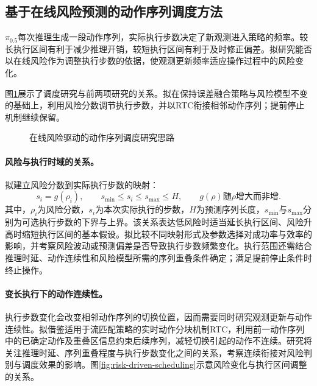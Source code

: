 \subsection{基于在线风险预测的动作序列调度方法}
\label{subsec:improvement-three}

\(\pi_{0.5}\)每次推理生成一段动作序列，实际执行步数决定了新观测进入策略的频率。较长执行区间有利于减少推理开销，较短执行区间有利于及时修正偏差。拟研究能否以在线风险作为调整执行步数的依据，使观测更新频率适应操作过程中的风险变化。

图\ref{fig:policy-risk-scheduling-delta}展示了调度研究与前两项研究的关系。拟在保持误差融合策略与风险模型不变的基础上，利用风险分数调节执行步数，并以RTC衔接相邻动作序列；提前停止机制继续保留。

\begin{figure}[htbp]
  \centering
  
  \caption{在线风险驱动的动作序列调度研究思路}
  \label{fig:policy-risk-scheduling-delta}
\end{figure}

\paragraph{风险与执行时域的关系。}
拟建立风险分数到实际执行步数的映射：
\begin{equation}
  s_i=g(\rho_i),\qquad
  s_{\min}\le s_i\le s_{\max}\le H,
  \qquad g(\rho)\text{随}\rho\text{增大而非增}.
  \label{eq:risk-schedule-rule}
\end{equation}
其中，\(\rho_i\)为风险分数，\(s_i\)为本次实际执行的步数，\(H\)为预测序列长度，\(s_{\min}\)与\(s_{\max}\)分别为可选执行步数的下界与上界。该关系表达低风险时适当延长执行区间、风险升高时缩短执行区间的基本假设。拟比较不同映射形式及参数选择对成功率与效率的影响，并考察风险波动或预测偏差是否导致执行步数频繁变化。执行范围还需结合推理时延、动作连续性和风险模型所需的序列重叠条件确定；满足提前停止条件时终止操作。

\paragraph{变长执行下的动作连续性。}
执行步数变化会改变相邻动作序列的切换位置，因而需要同时研究观测更新与动作连续性。拟借鉴适用于流匹配策略的实时动作分块机制RTC\cite{black2025rtc}，利用前一动作序列中的已确定动作及重叠区信息约束后续序列，减轻切换引起的动作不连续。研究将关注推理时延、序列重叠程度与执行步数变化之间的关系，考察连续衔接对风险判别与调度效果的影响。图\ref{fig:risk-driven-scheduling}示意风险变化与执行区间调整的关系。


